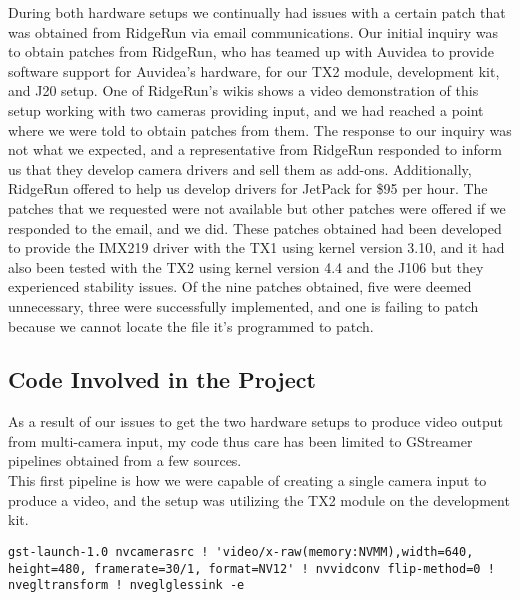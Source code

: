 \documentclass[letterpaper,10pt,serif,draftclsnofoot,onecolumn,compsoc,titlepage]{IEEEtran}
\begin{document}
During both hardware setups we continually had issues with a certain patch that was 
obtained from RidgeRun via email communications. Our initial inquiry was to obtain 
patches from RidgeRun, who has teamed up with Auvidea to provide software support for 
Auvidea's hardware, for our TX2 module, development kit, and J20 setup. One of RidgeRun's 
wikis shows a video demonstration of this setup working with two cameras 
providing input, and we had reached a point where we were told to obtain patches from 
them. The response to our inquiry was not what we expected, and a representative from 
RidgeRun responded to inform us that they develop camera drivers and sell them as 
add-ons. Additionally, RidgeRun offered to help us develop drivers for JetPack for 
\$95 per hour. The patches that we requested were not available but other patches were 
offered if we responded to the email, and we did. These patches obtained had been 
developed to
provide the IMX219 driver with the TX1 using kernel version 3.10, and it had also been
tested with the TX2 using kernel version 4.4 and the J106 but they experienced 
stability issues. Of the nine patches obtained, five were deemed unnecessary, three 
were successfully implemented, and one is failing to patch because we cannot locate 
the file it's programmed to patch. \\

\subsection{Code Involved in the Project}

As a result of our issues to get the two hardware setups to produce video output from 
multi-camera input, my code thus care has been limited to GStreamer pipelines obtained 
from a few sources. \\

This first pipeline is how we were capable of creating a single camera input to produce 
a video, and the setup was utilizing the TX2 module on the development kit. \\

\begin{lstlisting}
gst-launch-1.0 nvcamerasrc ! 'video/x-raw(memory:NVMM),width=640, height=480, framerate=30/1, format=NV12' ! nvvidconv flip-method=0 ! nvegltransform ! nveglglessink -e
\end{lstlisting}
\cite{OneCamPipe}
\end{document}
